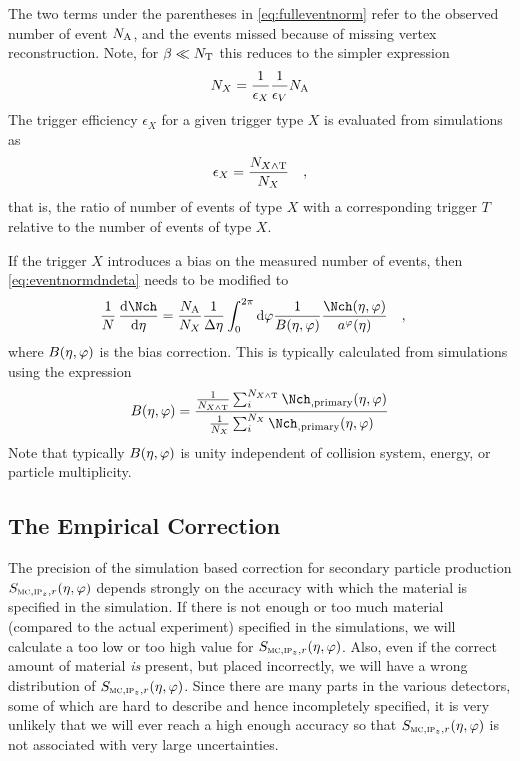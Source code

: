 The two terms under the parentheses in \eqref{eq:fulleventnorm} refer
to the observed number of event ${N_{\text{A}}}$, and the events missed because
of missing vertex reconstruction.  Note, for $\beta\ll{\ensuremath N_{\text{T}}}{}$
this reduces to the simpler expression
$$
{N_{X}} = \frac1{\epsilon_X}\frac1{\epsilon_V}{N_{\text{A}}}{}
$$
The trigger efficiency $\epsilon_X$ for a given trigger type $X$ is
evaluated from simulations as
\begin{align*}
  \epsilon_X = \frac{{N_{X\wedge \text{T}}}}{{N_{X}}}\quad,
\end{align*}
that is, the ratio of number of events of type $X$ with a
corresponding trigger $T$ relative to the number of events of type
$X$.

If the trigger $X$ introduces a bias on the measured number of events,
then \eqref{eq:eventnormdndeta} needs to be modified to 
\begin{align}
  \ndndeta &= 
  \frac{\NA}{\N{X}{}}\frac1{\Delta\eta} \int_0^{2\pi} \text{d}\varphi
  \frac{1}{B\etaphi}\frac{\dndetadphi}{\PhiAcc}
  \label{eq:eventnormdndeta2}\quad,
\end{align}
where $B(\eta,\varphi)$ is the bias correction.  This is typically
calculated from simulations using the expression 
\begin{align*}
  B\etaphi = \frac{\frac{1}{\N{X\wedge \text{T}}{}}\sum_i^{\N{X\wedge
        \text{T}}{}}
    \mult[,\text{primary}]\etaphi}{\frac{1}{\N{X}{}}\sum_i^{\N{X}{}}
    \mult[,\text{primary}]\etaphi}
\end{align*}
Note that typically $B(\eta,\varphi)$ is unity independent of collision
system, energy, or particle multiplicity. 

\subsection{The Empirical Correction} 
\label{sec:sub:empirical} 

The precision of the simulation based correction for secondary
particle production $\SecMap{}$ depends strongly on the accuracy with
which the material is specified in the simulation.  If there is not
enough or too much material (compared to the actual experiment)
specified in the simulations, we will calculate a too low or too high
value for $\SecMap$.  Also, even if the correct amount of material
\emph{is} present, but placed incorrectly, we will have a wrong
distribution of $\SecMap$.  Since there are many parts in the various
detectors, some of which are hard to describe and hence incompletely
specified, it is very unlikely that we will ever reach a high enough
accuracy so that $\SecMap$ is not associated with very large
uncertainties.

